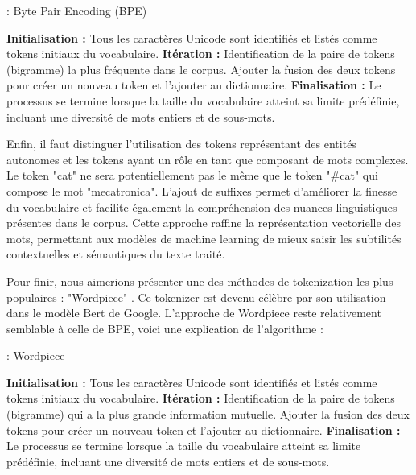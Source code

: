 \documentclass[12pt]{article}
\theoremstyle{definition}
\begin{document}
\begin{algorithm}
	\caption{ : Byte Pair Encoding (BPE)}
	\vspace{0.5em}  %
	\begin{algorithmic}[]
		\State \textbf{Initialisation :} Tous les caractères Unicode sont identifiés et listés comme tokens initiaux du vocabulaire.
		\State \textbf{Itération :} Identification de la paire de tokens (bigramme) la plus fréquente dans le corpus. Ajouter la fusion des deux tokens pour créer un nouveau token et l'ajouter au dictionnaire.
		\State \textbf{Finalisation :} Le processus se termine lorsque la taille du vocabulaire atteint sa limite prédéfinie, incluant une diversité de mots entiers et de sous-mots.
	\end{algorithmic}
\end{algorithm}
	
	Enfin, il faut distinguer l'utilisation des tokens représentant des entités autonomes et les tokens ayant un rôle en tant que composant de mots complexes. Le token "cat" ne sera potentiellement pas le même que le token "\#cat" qui compose le mot "mecatronica". L'ajout de suffixes permet d'améliorer la finesse du vocabulaire et facilite également la compréhension des nuances linguistiques présentes dans le corpus. Cette approche raffine la représentation vectorielle des mots, permettant aux modèles de machine learning de mieux saisir les subtilités contextuelles et sémantiques du texte traité.
	
	Pour finir, nous aimerions présenter une des méthodes de tokenization les plus populaires : "Wordpiece" \cite{Wordpiece}. Ce tokenizer est devenu célèbre par son utilisation dans le modèle Bert de Google. L'approche de Wordpiece reste relativement semblable à celle de BPE, voici une explication de l'algorithme :  
	
	\begin{algorithm}
		\caption{ : Wordpiece}
		\vspace{0.5em}  %
		\begin{algorithmic}[]
			\State \textbf{Initialisation :} Tous les caractères Unicode sont identifiés et listés comme tokens initiaux du vocabulaire.
			\State \textbf{Itération :} Identification de la paire de tokens (bigramme) qui a la plus grande information mutuelle. Ajouter la fusion des deux tokens pour créer un nouveau token et l'ajouter au dictionnaire.
			\State \textbf{Finalisation :} Le processus se termine lorsque la taille du vocabulaire atteint sa limite prédéfinie, incluant une diversité de mots entiers et de sous-mots.
		\end{algorithmic}
	\end{algorithm}
	
\end{document}
